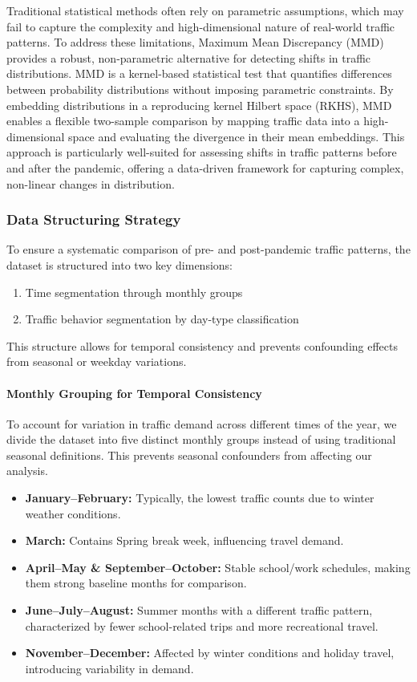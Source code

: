 \documentclass{article}
\begin{document}
Traditional statistical methods often rely on parametric assumptions, which may fail to capture the complexity and high-dimensional nature of real-world traffic patterns. To address these limitations, Maximum Mean Discrepancy (MMD) provides a robust, non-parametric alternative for detecting shifts in traffic distributions.
MMD is a kernel-based statistical test that quantifies differences between probability distributions without imposing parametric constraints. By embedding distributions in a reproducing kernel Hilbert space (RKHS), MMD enables a flexible two-sample comparison by mapping traffic data into a high-dimensional space and evaluating the divergence in their mean embeddings. This approach is particularly well-suited for assessing shifts in traffic patterns before and after the pandemic, offering a data-driven framework for capturing complex, non-linear changes in distribution.

\subsubsection{Data Structuring Strategy}

To ensure a systematic comparison of pre- and post-pandemic traffic patterns, the dataset is structured into two key dimensions:
\begin{enumerate}
    \item Time segmentation through monthly groups
    \item Traffic behavior segmentation by day-type classification
\end{enumerate}

This structure allows for temporal consistency and prevents confounding effects from seasonal or weekday variations.

\paragraph{Monthly Grouping for Temporal Consistency}

To account for variation in traffic demand across different times of the year, we divide the dataset into five distinct monthly groups instead of using traditional seasonal definitions. This prevents seasonal confounders from affecting our analysis.

\begin{itemize}
    \item \textbf{January–February:} Typically, the lowest traffic counts due to winter weather conditions.
    \item \textbf{March:} Contains Spring break week, influencing travel demand.
    \item \textbf{April–May \& September–October:} Stable school/work schedules, making them strong baseline months for comparison.
    \item \textbf{June–July–August:} Summer months with a different traffic pattern, characterized by fewer school-related trips and more recreational travel.
    \item \textbf{November–December:} Affected by winter conditions and holiday travel, introducing variability in demand.
\end{itemize}
\end{document}
